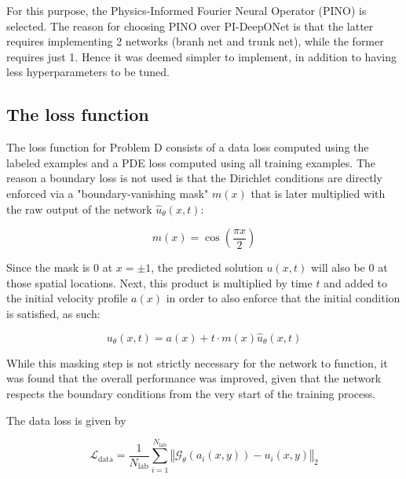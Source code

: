 For this purpose, the Physics-Informed Fourier Neural Operator (PINO) is selected. The reason for choosing PINO over PI-DeepONet is that the latter requires implementing 2 networks (branh net and trunk net), while the former requires just 1. Hence it was deemed simpler to implement, in addition to having less hyperparameters to be tuned.




\newpage
\subsection{The loss function}
%   

The loss function for Problem D consists of a data loss computed using the labeled examples and a PDE loss computed using all training examples. The reason a boundary loss is not used is that the Dirichlet conditions are directly enforced via a "boundary-vanishing mask" $m(x)$ that is later multiplied with the raw output of the network $\hat u_\theta(x,t)$:

\begin{equation}
	m(x) = \cos\left( \frac{\pi x}{2} \right)
\end{equation}

Since the mask is 0 at $x = \pm 1$, the predicted solution $u(x,t)$ will also be 0 at those spatial locations. Next, this product is multiplied by time $t$ and added to the initial velocity profile $a(x)$ in order to also enforce that the initial condition is satisfied, as such:

\begin{equation} \label{eq:t_mask_u_hat}
	u_\theta(x,t) = a(x) + t \cdot m(x) \hat u_\theta(x,t)
\end{equation}

While this masking step is not strictly necessary for the network to function, it was found that the overall performance was improved, given that the network respects the boundary conditions from the very start of the training process.

The data loss is given by

\begin{equation}
	\mathcal{L}_\mathrm{data} = \frac{1}{N_\mathrm{lab}} \sum_{i=1}^{N_\mathrm{lab}} \left\Vert \mathcal{G}_\theta \left(a_i(x,y)\right) - u_i(x,y) \right\Vert_2
\end{equation}

